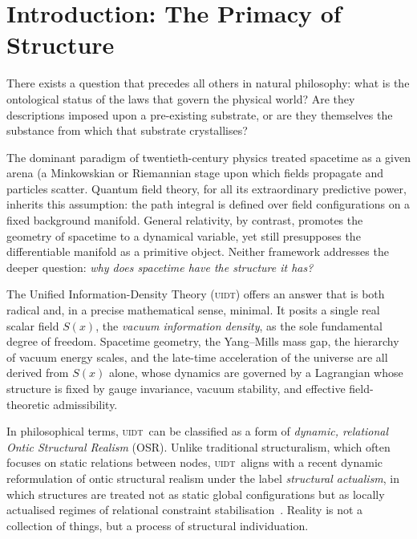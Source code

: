\documentclass[12pt,a4paper,twoside]{article}
\theoremstyle{plain}
\theoremstyle{definition}
\theoremstyle{remark}
\newcommand{\UIDT}{\textsc{uidt}}
\newcommand{\Sx}{S(x)}
\begin{document}
\section{Introduction: The Primacy of Structure}
\label{sec:introduction}

There exists a question that precedes all others in natural philosophy: what is
the ontological status of the laws that govern the physical world? Are they
descriptions imposed upon a pre-existing substrate, or are they themselves the
substance from which that substrate crystallises?

The dominant paradigm of twentieth-century physics treated spacetime as a given
arena (a Minkowskian or Riemannian stage upon which fields propagate and
particles scatter. Quantum field theory, for all its extraordinary predictive
power, inherits this assumption: the path integral is defined over field
configurations on a fixed background manifold. General relativity, by contrast,
promotes the geometry of spacetime to a dynamical variable, yet still presupposes
the differentiable manifold as a primitive object. Neither framework addresses
the deeper question: \emph{why does spacetime have the structure it has?}

The Unified Information-Density Theory (\UIDT) offers an answer that is both
radical and, in a precise mathematical sense, minimal. It posits a single real
scalar field $\Sx$, the \emph{vacuum information density}, as the sole
fundamental degree of freedom. Spacetime geometry, the Yang--Mills mass gap, the
hierarchy of vacuum energy scales, and the late-time acceleration of the
universe are all derived from $\Sx$ alone, whose dynamics are
governed by a Lagrangian whose structure is fixed by gauge invariance, vacuum
stability, and effective field-theoretic admissibility.

In philosophical terms, \UIDT\ can be classified as a form of \emph{dynamic,
relational Ontic Structural Realism} (OSR). Unlike traditional structuralism,
which often focuses on static relations between nodes, \UIDT\ aligns with a
recent dynamic reformulation of ontic structural realism under the label
\emph{structural actualism}, in which structures are treated not as static
global configurations but as locally actualised regimes of relational
constraint stabilisation~\cite{LeNepvou2025StructuralActualism}. Reality is
not a collection of things, but a process of structural individuation.
\end{document}
